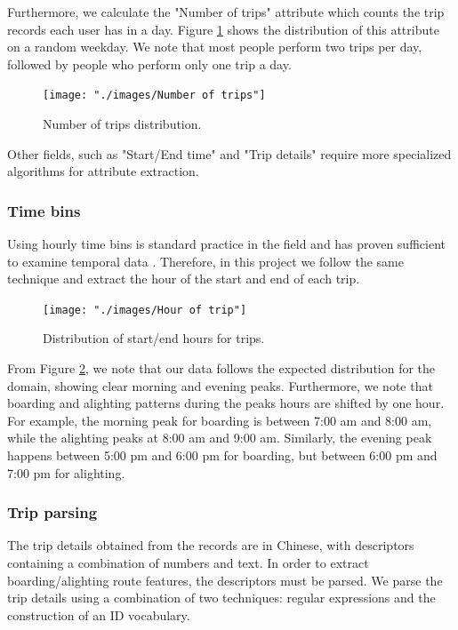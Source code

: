 \documentclass{article}
\begin{document}
Furthermore, we calculate the "Number of trips" attribute which counts the trip records each user has in a day. Figure \ref{fig:preprocessing/num_trips} shows the distribution of this attribute on a random weekday. We note that most people perform two trips per day, followed by people who perform only one trip a day. 

\begin{figure}[H]
  \centering
  \texttt{[image: "./images/Number of trips"]}
  \caption{Number of trips distribution.}
  \label{fig:preprocessing/num_trips}
\end{figure}

Other fields, such as "Start/End time" and "Trip details" require more specialized algorithms for attribute extraction.

\subsubsection{Time bins}
Using hourly time bins is standard practice in the field and has proven sufficient to examine temporal data \cite{langlois2016inferring} \cite{ma2017understanding} \cite{morency2007measuring}. Therefore, in this project we follow the same technique and extract the hour of the start and end of each trip.

\begin{figure}[H]
  \centering
  \texttt{[image: "./images/Hour of trip"]}
  \caption{Distribution of start/end hours for trips.}
  \label{fig:preprocessing/start_end_hour}
\end{figure}

From Figure \ref{fig:preprocessing/start_end_hour}, we note that our data follows the expected distribution for the domain, showing clear morning and evening peaks. Furthermore, we note that boarding and alighting patterns during the peaks hours are shifted by one hour. For example, the morning peak for boarding is between 7:00 am and 8:00 am, while the alighting peaks at 8:00 am and 9:00 am. Similarly, the evening peak happens between 5:00 pm and 6:00 pm for boarding, but between 6:00 pm and 7:00 pm for alighting. 

\subsubsection{Trip parsing} 
\label{sec:tripParsing}
The trip details obtained from the records are in Chinese, with descriptors containing a combination of numbers and text. In order to extract boarding/alighting route features, the descriptors must be parsed. We parse the trip details using a combination of two techniques: regular expressions and the construction of an ID vocabulary. 
\end{document}
